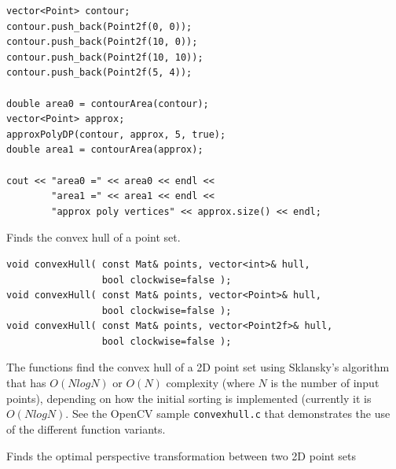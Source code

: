 \begin{description}
\begin{lstlisting}
vector<Point> contour;
contour.push_back(Point2f(0, 0));
contour.push_back(Point2f(10, 0));
contour.push_back(Point2f(10, 10));
contour.push_back(Point2f(5, 4));

double area0 = contourArea(contour);
vector<Point> approx;
approxPolyDP(contour, approx, 5, true);
double area1 = contourArea(approx);

cout << "area0 =" << area0 << endl <<
        "area1 =" << area1 << endl <<
        "approx poly vertices" << approx.size() << endl; 
\end{lstlisting}

Finds the convex hull of a point set.

\begin{lstlisting}
void convexHull( const Mat& points, vector<int>& hull,
                 bool clockwise=false );
void convexHull( const Mat& points, vector<Point>& hull,
                 bool clockwise=false );
void convexHull( const Mat& points, vector<Point2f>& hull,
                 bool clockwise=false );
\end{lstlisting}
\begin{description}
\end{description}

The functions find the convex hull of a 2D point set using Sklansky's algorithm \cite{Sklansky82} that has $O(N logN)$ or $O(N)$ complexity (where $N$ is the number of input points), depending on how the initial sorting is implemented (currently it is $O(N logN)$. See the OpenCV sample \texttt{convexhull.c} that demonstrates the use of the different function variants. 

\label{findHomography}
Finds the optimal perspective transformation between two 2D point sets


\end{description}
